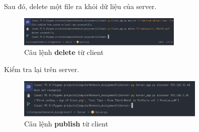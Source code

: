 \documentclass[a4paper]{article}
\begin{document}
	\\
	Sau đó, delete một file ra khỏi dữ liệu của server.
	\begin{figure}[h]
		\begin{center}
			\includegraphics[width=0.7\textwidth]{tests/delete_command.png}
			\hspace{\textwidth}
			\caption{Câu lệnh \textbf{delete} từ client}
			\label{delete_command}
		\end{center}
	\end{figure}
	\newpage
	Kiểm tra lại trên server.
	\begin{figure}[h]
		\begin{center}
			\includegraphics[width=0.8\textwidth]{tests/server_dis_af_delete.png}
			\hspace{\textwidth}
			\caption{Câu lệnh \textbf{publish} từ client}
			\label{server_dis2_command}
		\end{center}
	\end{figure}
\end{document}
